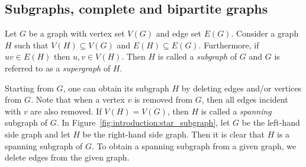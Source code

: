 
\subsection{Subgraphs, complete and bipartite graphs}

\begin{definition}
Let $G$ be a graph with vertex set $V(G)$ and edge set
$E(G)$. Consider a graph $H$ such that $V(H) \subseteq V(G)$ and $E(H)
\subseteq E(G)$. Furthermore, if $uv \in E(H)$ then $u,v \in
V(H)$. Then $H$ is called a \emph{subgraph} of $G$ and $G$ is referred
to as a \emph{supergraph} of $H$.
\end{definition}

Starting from $G$, one can obtain its subgraph $H$ by deleting edges
and/or vertices from $G$. Note that when a vertex $v$ is removed from
$G$, then all edges incident with $v$ are also removed. If $V(H) =
V(G)$, then $H$ is called a \emph{spanning} subgraph of $G$. In
Figure~\ref{fig:introduction:star_subgraph}, let $G$ be the left-hand
side graph and let $H$ be the right-hand side graph. Then it is clear
that $H$ is a spanning subgraph of $G$. To obtain a spanning subgraph
from a given graph, we delete edges from the given graph.

